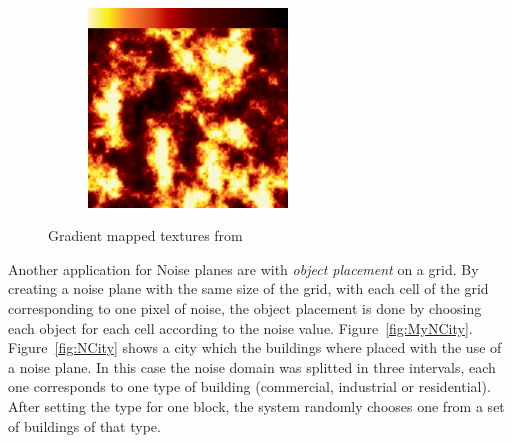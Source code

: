 \begin{figure}
\begin{subfigure}[b]{0.3\textwidth}
                \label{fig:Nblackandwhite}
        \end{subfigure}
        ~ %
        \begin{subfigure}[b]{0.3\textwidth}
                \includegraphics[width=\textwidth]{img/Theory/Perlin_Noise/gradient_fire.png}
                \label{fig:Nredblack}
        \end{subfigure}
        \caption{Gradient mapped textures from \cite{NoisesGAMES}}
        \label{fig:NTextures}
\end{figure}

Another application for Noise planes are with \emph{object placement} on a grid. By creating a noise plane with the same size of the grid, with each cell of the grid corresponding to one pixel of noise, the object placement is done by choosing each object for each cell according to the noise value. Figure~\ref{fig:MyNCity}.
Figure~\ref{fig:NCity} shows a city which the buildings where placed with the use of a noise plane. In this case the noise domain was splitted in three intervals, each one corresponds to one type of building (commercial, industrial or residential). After setting the type for one block, the system randomly chooses one from a set of buildings of that type.

